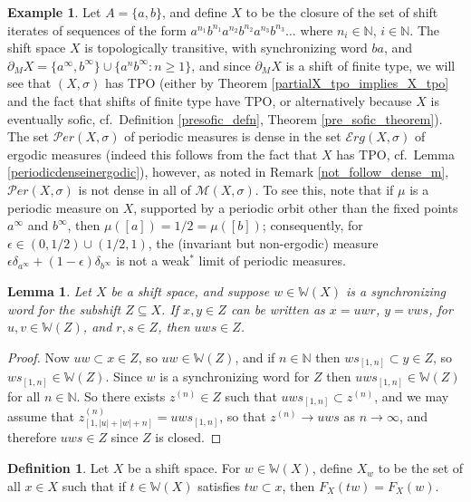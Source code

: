 \documentclass[reqno,11pt]{amsart}
\newtheorem{lem}[thm]{Lemma}
\theoremstyle{definition}
\newtheorem{defn}[thm]{Definition}
\newtheorem{exam}[thm]{Example}
\theoremstyle{remark}
\theoremstyle{remark}
\def \N {\mathbb N}
\def\m{\mathcal M}
\def\per{{\mathcal{P}er}}
\def\e{\mathcal{E}rg}
\def\w{\mathbb{W}}
\numberwithin{equation}{section}
\begin{document}
\begin{exam}\label{tpo_despite_periodics_not_dense_in_m}
Let $A=\{a,b\}$, and define $X$ to be the closure of the set of shift iterates of sequences of the form
$a^{n_1}b^{n_1}a^{n_2}b^{n_2}a^{n_3}b^{n_3}\ldots$
where $n_i\in\N$, $i\in\N$.
The shift space $X$ is topologically transitive, 
with synchronizing word $ba$,
and 
$\partial_M X = \{a^\infty, b^\infty\} \cup \{a^nb^\infty : n\ge 1\}$,
and since $\partial_M X$ is a shift of finite type, we will see  that $(X,\sigma)$ has TPO
(either by Theorem \ref{partialX_tpo_implies_X_tpo} and the fact that shifts of finite type have TPO, or alternatively because $X$ is eventually sofic, cf.~Definition \ref{presofic_defn}, Theorem \ref{pre_sofic_theorem}).
The set $\per(X,\sigma)$ of periodic measures is dense in the set $\e(X,\sigma)$
of ergodic measures
(indeed this follows from the fact that $X$ has TPO, cf.~Lemma \ref{periodicdenseinergodic}),
however, as noted in Remark \ref{not_follow_dense_m}, $\per(X,\sigma)$ is not dense in all of $\m(X,\sigma)$.
To see this, note that
if $\mu$ is a periodic measure on $X$, supported by a periodic orbit other than
the fixed points $a^\infty$ and $b^\infty$, then $\mu([a])=1/2=\mu([b])$;
consequently, for $\epsilon\in (0,1/2)\cup (1/2,1)$, the (invariant but non-ergodic) measure $\epsilon \delta_{a^\infty}+(1-\epsilon)\delta_{b^\infty}$ is not a weak$^*$ limit of periodic measures.
\end{exam}


\begin{lem}\label{uwsinz}
Let $X$ be a shift space, and suppose  $w\in\w(X)$ is a synchronizing word for the subshift $Z\subseteq X$.
If $x,y\in Z$ can be written as $x=uwr$, $y=vws$, for $u,v\in \w(Z)$, and $r,s\in Z$, then $uws\in Z$.
\end{lem}	
\begin{proof}
Now $uw\subset x\in Z$, so $uw\in\w(Z)$, and if $n\in\N$ then $ws_{[1,n]}\subset y\in Z$, so $ws_{[1,n]}\in \w(Z)$.
Since $w$ is a synchronizing word for $Z$ then $uws_{[1,n]}\in \w(Z)$ for all $n\in\N$.
So there exists $z^{(n)}\in Z$ such that $uws_{[1,n]} \subset z^{(n)}$, and we may assume that
$z^{(n)}_{[1,|u|+|w|+n]}=uws_{[1,n]}$, so that $z^{(n)}\to uws$ as $n\to\infty$, and therefore $uws\in Z$ since $Z$ is closed.
\end{proof}

\begin{defn}\label{d-1} Let $X$ be a shift space. For $w\in\w(X)$,
define $X_w$ to be 
	the set of all $x\in X$ 
such that  if $t\in\w(X)$ satisfies $tw \subset x$, then $F_X(tw)=F_X(w)$.
\end{defn}
\end{document}
